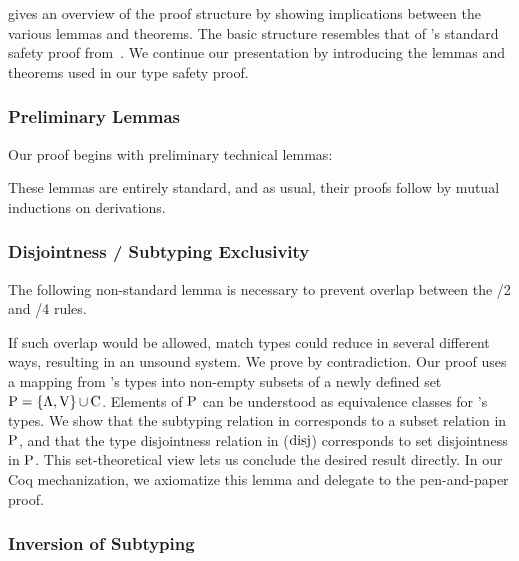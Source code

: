 
 gives an overview of the proof structure by showing implications between the various lemmas and theorems.
The basic structure resembles that of \SystemFsub's standard safety proof from~\citep{pierce2002types}.
We continue our presentation by introducing the lemmas and theorems used in our type safety proof.

\subsubsection*{Preliminary Lemmas}
Our proof begins with preliminary technical lemmas:
%




%
These lemmas are entirely standard, and as usual, their proofs follow by mutual inductions on derivations.

\subsubsection*{Disjointness / Subtyping Exclusivity}
The following non-standard lemma is necessary to prevent overlap between the /2 and /4 rules.
%

%
If such overlap would be allowed, match types could reduce in several different ways, resulting in an unsound system.
We prove  by contradiction.
Our proof uses a mapping from \SystemFm's types into non-empty subsets of a newly defined set $\P \= \{ \Λ, \V \} \∪ \C$.
Elements of $\P$ can be understood as equivalence classes for \Fm's types.
We show that the subtyping relation in \Fm corresponds to a subset relation in $\P$, and that the type disjointness relation in \Fm ($\disj$) corresponds to set disjointness in $\P$.
This set-theoretical view lets us conclude the desired result directly.
In our Coq mechanization, we axiomatize this lemma and delegate to the pen-and-paper proof.

\subsubsection*{Inversion of Subtyping}

